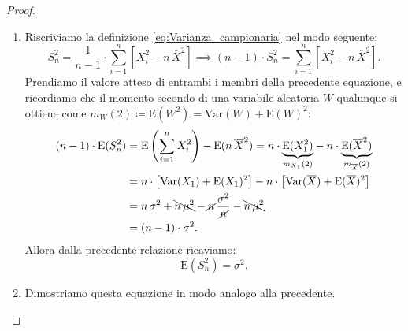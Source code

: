         \begin{proof}
            \hfill
            \begin{enumerate}
                \item Riscriviamo la definizione \eqref{eq:Varianza_campionaria} nel modo seguente: \[
                        S_n^2 = \frac{1}{n-1} \cdot \sum_{i=1}^{n} \left[X_i^2 - n\, \overline{X}^2\right] 
                        \implies (n-1)\cdot S_n^2 = \sum_{i=1}^{n} \left[X_i^2 - n\, \overline{X}^2\right]
                    .\] Prendiamo il valore atteso di entrambi i membri della precedente equazione, e 
                    ricordiamo che il momento secondo di una variabile aleatoria $W$ qualunque si ottiene 
                    come $m_W(2) \coloneqq \text{E}(W^2) = \text{Var}(W) + \text{E}(W)^2$:
                    \begin{align*}
                        (n-1) \cdot \text{E}(S_n^2) &= \text{E}\left(\sum_{i=1}^{n} X_i^2\right) - 
                        \text{E}(n\, \overline{X}^2) 
                        = n\cdot \underset{m_{X_1}(2)}{\underbrace{\text{E}(X_1^2)}} - n\cdot 
                        \underset{m_{\overline{X}}(2)}{\underbrace{\text{E}(\overline{X}^2)}} \\
                        &= n\cdot \left[\text{Var}(X_1) + \text{E}(X_1)^2\right] -
                        n\cdot \left[\text{Var}(\overline{X}) + \text{E}(\overline{X})^2\right] \\
                        &= n\, \sigma^2 +\bcancel{n\, \mu^2} - \cancel{n}\,\frac{\sigma^2}{\cancel{n}} -\bcancel{n\, \mu^2} \\
                        &= (n-1)\cdot \sigma^2
                    .\end{align*}
                    Allora dalla precedente relazione ricaviamo: \[
                    \text{E}(S_n^2) = \sigma^2
                    .\]
                \item Dimostriamo questa equazione in modo analogo alla precedente. \qedhere
            \end{enumerate}
        \end{proof}
